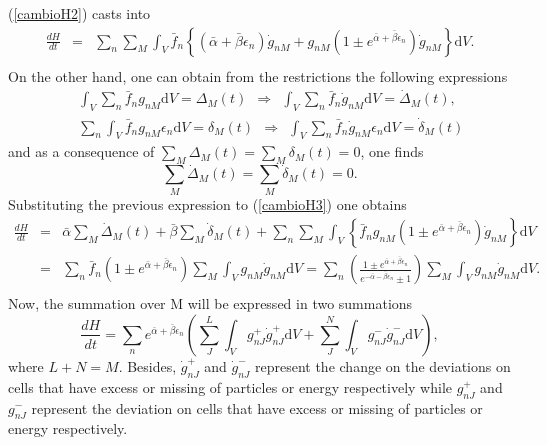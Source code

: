\documentclass{article}
\begin{document}
(\ref{cambioH2}) casts into
\begin{eqnarray}
    \frac{dH}{dt}&=&\sum_n \sum_M \int_V\bar{f}_n\left \{ (\bar{\alpha}+\bar{\beta}{\epsilon}_n)\dot{g}_{nM}+ g_{nM}\left(1\pm e^{\bar{\alpha}+\bar{\beta}{\epsilon}_n}\right)\dot{g}_{nM} \right \}\mathrm{d}V. \nonumber \\
    \label{cambioH3}
\end{eqnarray}{}
On the other hand, one can obtain from the restrictions the following expressions
\begin{eqnarray}
    &&\int_V\sum_n \bar{f}_n g_{nM}\mathrm{d}V=\Delta_M(t) \ \  \Rightarrow \ \ \int_V \sum_n \bar{f}_n \dot{g}_{nM}\mathrm{d}V=\dot{\Delta}_M(t), \nonumber \\
    &&\sum_n \int_V \bar{f}_n g_{nM}\epsilon_n\mathrm{d}V=\delta_M(t) \ \  \Rightarrow \ \ \int_V \sum_n \bar{f}_n \dot{g}_{nM}\epsilon_n\mathrm{d}V=\dot{\delta}_M(t)
\end{eqnarray}{}
and as a consequence of $\sum_M \Delta_M(t)=\sum_M \delta_M(t)=0$, one finds
\begin{equation}
    \sum_M \dot{\Delta}_M(t)=\sum_M \dot{\delta}_{M}(t)=0.
\end{equation}{}
Substituting the previous expression to (\ref{cambioH3}) one obtains
\begin{eqnarray}
   \frac{dH}{dt}&=& \bar{\alpha}\sum_M \dot{\Delta}_M(t)+\bar{\beta}\sum_M \dot{\delta}_M(t)+\sum_n \sum_M \int_V\left \{ \bar{f}_{n}g_{nM}\left(1\pm e^{\bar{\alpha}+\bar{\beta}{\epsilon}_n}\right)\dot{g}_{nM} \right \}\mathrm{d}V \nonumber \\
   &=&\sum_n  \bar{f}_{n}\left(1\pm e^{\bar{\alpha}+\bar{\beta}{\epsilon}_n}\right)\sum_M \int_V g_{nM}\dot{g}_{nM}\mathrm{d}V= \sum_n \left(\frac{1\pm e^{\bar{\alpha}+\bar{\beta}\epsilon_n}}{e^{-\bar{\alpha}-\bar{\beta}\epsilon_n}\pm 1} \right)\sum_M \int_V g_{nM}\dot{g}_{nM}\mathrm{d}V. \nonumber \\ \label{cambioH4}
\end{eqnarray}{}
Now, the summation over M will be expressed in two summations
\begin{equation}
    \frac{dH}{dt}=\sum_n  e^{\bar{\alpha}+\bar{\beta}\epsilon_n}\left(\sum_J ^{L}\int_V g^{+}_{nJ}\dot{g}^{+}_{nJ}\mathrm{d}V+\sum^{N}_J \int_V g^{-}_{nJ}\dot{g}^{-}_{nJ}\mathrm{d}V \right), \label{cambioH5}
\end{equation}{}
where $L+N=M$. Besides, $\dot{g}^{+}_{nJ}$ and $\dot{g}^{-}_{nJ}$  represent the change on the deviations on cells that have excess or missing of particles or energy respectively while $g^{+}_{nJ}$ and $g^{-}_{nJ}$ represent the deviation on cells that have excess or missing of particles or energy respectively.\\
\end{document}
